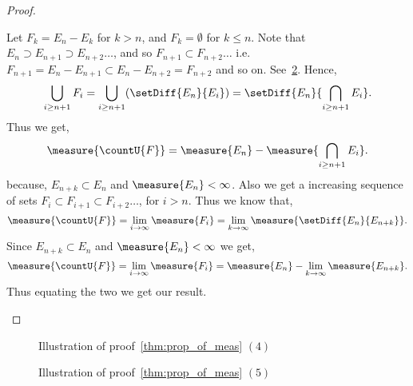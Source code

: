 \begin{proof}
\begin{enumerate}
	   Let $F_k = E_n - E_k$ for $k > n$, and $F_k = \emptyset$ for $k \leq n$. 
	   Note that $E_n \supset E_{n+1} \supset E_{n+2} \dots$, 
	   and so $F_{n+1} \subset F_{n+2} \dots$ i.e.~$F_{n+1} = E_n - E_{n+1} \subset E_n -
	   E_{n+2} = F_{n+2}$ and so on. See~\ref{fig:tikz:measure_prop2}. Hence,
	   \[\bigcup\limits_{i \geq n+1} F_i = \bigcup\limits_{i \geq n+1}(\setDiff{E_n}{E_i}) =
	       \setDiff{E_n}{\bigcap\limits_{i \geq n+1}E_i}.\]
	   Thus we get,
	   \[\measure{\countU{F}} = \measure{E_n} - \measure{\bigcap\limits_{i \geq n+1}E_i}.\]
	   because, $E_{n+k} \subset E_n$ and $\measure{E_n} < \infty$.
	   Also we get a increasing sequence of sets $F_{i} \subset
	   F_{i+1} \subset F_{i+2} \dots$, for $i > n$. Thus we know that,
	   \[\measure{\countU{F}} = \lim\limits_{i\to\infty}\measure{F_i} = \lim\limits_{k\to\infty}
	       \measure{\setDiff{E_n}{E_{n+k}}}.\]
	   Since $E_{n+k} \subset E_n$ and $\measure{E_n} < \infty$ we get,
	  \[\measure{\countU{F}} = \lim\limits_{i\to\infty}\measure{F_i} = 
	      \measure{E_n} - \lim\limits_{k\to\infty}\measure{E_{n+k}}.\]
	  Thus equating the two we get our result.
 
    \end{enumerate}
\end{proof}

\begin{figure}
    
    \caption{Illustration of proof~\ref{thm:prop_of_meas} $(4)$}\label{fig:tikz:measure_prop}
\end{figure}
\begin{figure}
    
    \caption{Illustration of proof~\ref{thm:prop_of_meas} $(5)$}\label{fig:tikz:measure_prop2}
\end{figure}

